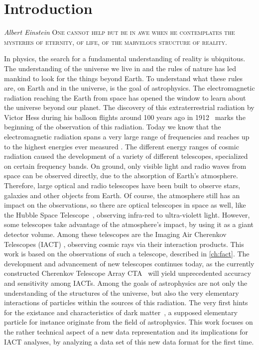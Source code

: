\chapter{Introduction}
\nocite{biblatex, siunitx, Hunter:2007}%
%
\begin{aquote}{\textit{Albert Einstein}}
\textsc{One cannot help but be in awe when he contemplates the mysteries of eternity, of life, of the marvelous structure of reality.}
\end{aquote}
In physics, the search for a fundamental understanding of reality is ubiquitous. The understanding of the universe we live in and the rules of nature has
led mankind to look for the things beyond Earth. To understand what these rules
are, on Earth and in the universe, is the goal of astrophysics. The electromagnetic radiation reaching the Earth from space has opened the window to learn
about the universe beyond our planet. The discovery of this extraterrestrial
radiation by Victor Hess during his balloon flights around \num{100} years ago in \num{1912}~\cite{Hess} marks the beginning of the observation of this radiation.
Today we know that the electromagnetic radiation spans a very large range of
frequencies and reaches up to the highest energies ever measured \cite{aharonian}.
The different energy ranges of cosmic radiation caused the development of a
variety of different telescopes, specialized on certain frequency bands. On
ground, only visible light and radio waves from space can be observed directly,
due to the absorption of Earth's atmosphere. Therefore, large optical and radio
telescopes have been built to observe stars, galaxies and other objects from
Earth. Of course, the atmosphere still has an impact on the observations, so
there are optical telescopes in space as well, like the Hubble Space
Telescope~\cite{hubble}, observing infra-red to ultra-violett light. However,
some telescopes take advantage of the atmosphere's impact, by using it as a
giant detector volume. Among these telescopes are the Imaging Air Cherenkov
Telescopes (IACT) \cite{whipple}, observing cosmic rays via their interaction products. This
work is based on the observations of such a telescope, described in
\autoref{ch:fact}. The development and advancement of new telescopes continues
today, as the currently constructed Cherenkov Telescope Array CTA~\cite{cta}
will yield unprecedented accuracy and sensitivity among IACTs.
Among the goals of astrophysics are not only the understanding of the
structures of the universe, but also the very elementary interactions of
particles within the sources of this radiation. The very first hints for the
existance and characteristics of dark matter~\cite{zwicky}, a supposed
elementary particle for instance originate from the field of astrophysics.
This work focuses on the rather technical aspect of a new data representation
and its implications for IACT analyses, by analyzing a data set of this new data
format for the first time.
